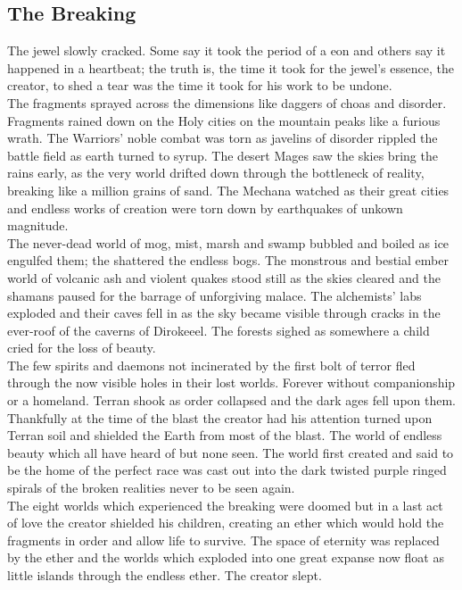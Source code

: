 \documentclass[a4paper]{article}
\begin{document}
\subsection{The Breaking}

The jewel slowly cracked. Some say it took the period of a eon and others say it happened in a heartbeat; the truth is, the time it took for the jewel's essence, the creator, to shed a tear was the time it took for his work to be undone.\\
The fragments sprayed across the dimensions like daggers of choas and disorder. Fragments rained down on the Holy cities on the mountain peaks like a furious wrath. The Warriors' noble combat was torn as javelins of disorder rippled the battle field as earth turned to syrup. The desert Mages saw the skies bring the rains early, as the very world drifted down through the bottleneck of reality, breaking like a million grains of sand. The Mechana watched as their great cities and endless works of creation were torn down by earthquakes of unkown magnitude.\\
The never-dead world of mog, mist, marsh and swamp bubbled and boiled as ice engulfed them; the shattered the endless bogs. The monstrous and bestial ember world of volcanic ash and violent quakes stood still as the skies cleared and the shamans paused for the barrage of unforgiving malace. The alchemists' labs exploded and their caves fell in as the sky became visible through cracks in the ever-roof of the caverns of Dirokeeel. The forests sighed as somewhere a child cried for the loss of beauty.\\
The few spirits and daemons not incinerated by the first bolt of terror fled through the now visible holes in their lost worlds. Forever without companionship or a homeland. Terran shook as order collapsed and the dark ages fell upon them. Thankfully at the time of the blast the creator had his attention turned upon Terran soil and shielded the Earth from most of the blast. The world of endless beauty which all have heard of but none seen. The world first created and said to be the home of the perfect race was cast out into the dark twisted purple ringed spirals of the broken realities never to be seen again.\\
The eight worlds which experienced the breaking were doomed but in a last act of love the creator shielded his children, creating an ether which would hold the fragments in order and allow life to survive. The space of eternity was replaced by the ether and the worlds which exploded into one great expanse now float as little islands through the endless ether. The creator slept.
\end{document}
